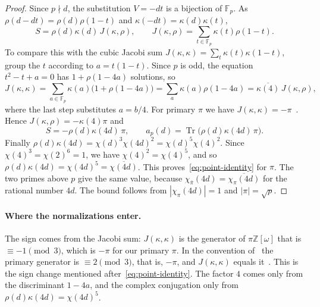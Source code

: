\documentclass[11pt]{article}
\numberwithin{equation}{section}
\newcommand{\OO}{\mathbb Z[\omega]}
\newcommand{\Tr}{\operatorname{Tr}}
\begin{document}
\begin{proof}
Since $p\nmid d$, the substitution $V=-dt$ is a bijection of $\mathbb F_p$. As
$\rho(d-dt)=\rho(d)\rho(1-t)$ and $\kappa(-dt)=\kappa(d)\kappa(t)$,
\begin{equation}\label{eq:d015}
 S=\rho(d)\kappa(d)\,J(\kappa,\rho),\qquad J(\kappa,\rho)=\sum_{t\in\mathbb F_p}\kappa(t)\rho(1-t).
\end{equation}
To compare this with the cubic Jacobi sum $J(\kappa,\kappa)=\sum_t\kappa(t)\kappa(1-t)$, group the $t$ according
to $a=t(1-t)$. Since $p$ is odd, the equation $t^2-t+a=0$ has $1+\rho(1-4a)$ solutions, so
\begin{equation}\label{eq:d016}
 J(\kappa,\kappa)=\sum_{a\in\mathbb F_p}\kappa(a)\bigl(1+\rho(1-4a)\bigr)
 =\sum_a\kappa(a)\rho(1-4a)=\overline{\kappa(4)}\,J(\kappa,\rho),
\end{equation}
where the last step substitutes $a=b/4$. For primary $\pi$ we have $J(\kappa,\kappa)=-\pi$~\cite[Theorem~15]{QF}.
Hence $J(\kappa,\rho)=-\kappa(4)\pi$ and
\begin{equation}\label{eq:b1-S}
 S=-\rho(d)\kappa(4d)\,\pi,\qquad a_p(d)=\Tr\bigl(\rho(d)\kappa(4d)\,\pi\bigr).
\end{equation}
Finally $\rho(d)\kappa(4d)=\chi(d)^3\chi(4d)^2=\chi(d)^5\chi(4)^2$. Since $\chi(4)^3=\chi(2)^6=1$, we have
$\chi(4)^2=\chi(4)^5$, and so $\rho(d)\kappa(4d)=\chi(4d)^5=\overline{\chi(4d)}$. This proves~\eqref{eq:point-identity}
for $\pi$. The two primes above $p$ give the same value, because $\chi_{\bar\pi}(4d)=\overline{\chi_\pi(4d)}$ for the
rational number $4d$. The bound follows from $|\chi_\pi(4d)|=1$ and $|\pi|=\sqrt p$.
\end{proof}

\paragraph{Where the normalizations enter.} The sign comes from the Jacobi sum: $J(\kappa,\kappa)$ is the generator
of $\pi\OO$ that is $\equiv-1\pmod3$, which is $-\pi$ for our primary $\pi$. In the convention of~\cite[Chapter~9]{IR}
the primary generator is $\equiv2\pmod 3$, that is, $-\pi$, and $J(\kappa,\kappa)$ equals it~\cite[Remark~10]{QF}.
This is the sign change mentioned after~\eqref{eq:point-identity}. The factor $4$ comes only from the discriminant
$1-4a$, and the complex conjugation only from $\rho(d)\kappa(4d)=\chi(4d)^5$.
\end{document}
